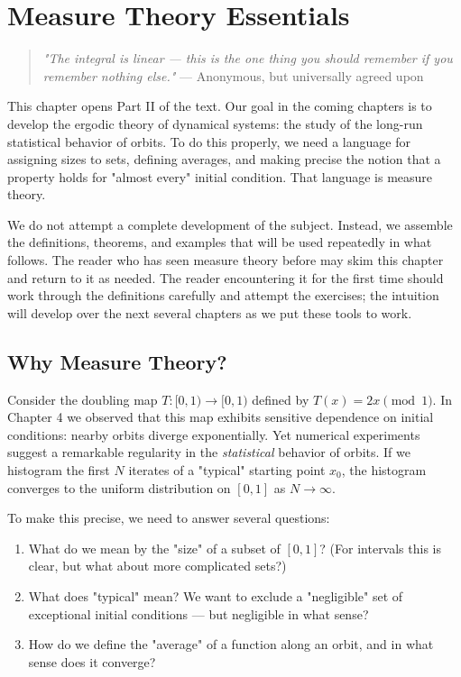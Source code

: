 \chapter{Measure Theory Essentials}\label{ch:7}

\begin{quote}
\textit{"The integral is linear --- this is the one thing you should remember if you remember nothing else."}
--- Anonymous, but universally agreed upon
\end{quote}

This chapter opens Part II of the text. Our goal in the coming chapters is to develop the ergodic theory of dynamical systems: the study of the long-run statistical behavior of orbits. To do this properly, we need a language for assigning sizes to sets, defining averages, and making precise the notion that a property holds for "almost every" initial condition. That language is measure theory.

We do not attempt a complete development of the subject. Instead, we assemble the definitions, theorems, and examples that will be used repeatedly in what follows. The reader who has seen measure theory before may skim this chapter and return to it as needed. The reader encountering it for the first time should work through the definitions carefully and attempt the exercises; the intuition will develop over the next several chapters as we put these tools to work.


\bigskip


\section{Why Measure Theory?}\label{sec:7.1}

Consider the doubling map $T: [0,1) \to [0,1)$ defined by $T(x) = 2x \pmod{1}$. In Chapter 4 we observed that this map exhibits sensitive dependence on initial conditions: nearby orbits diverge exponentially. Yet numerical experiments suggest a remarkable regularity in the \textit{statistical} behavior of orbits. If we histogram the first $N$ iterates of a "typical" starting point $x_0$, the histogram converges to the uniform distribution on $[0,1]$ as $N \to \infty$.

To make this precise, we need to answer several questions:

\begin{enumerate}[nosep]
  \item What do we mean by the "size" of a subset of $[0,1]$? (For intervals this is clear, but what about more complicated sets?)
  \item What does "typical" mean? We want to exclude a "negligible" set of exceptional initial conditions --- but negligible in what sense?
  \item How do we define the "average" of a function along an orbit, and in what sense does it converge?
\end{enumerate}

